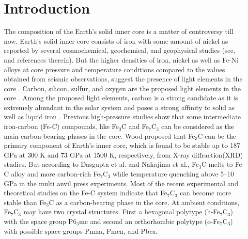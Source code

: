 \documentclass[prb,aps,preprint]{revtex4-2}
\begin{document}
\section{Introduction}
The composition of the Earth's solid inner core is a matter of controversy till now. Earth's solid inner core consists of  iron with some amount of nickel as reported by several cosmochemical, geochemical, and geophysical studies (see\cite{dubrovinsky2007body,lin2002iron,birch1952elasticity}, and references therein). But the higher densities of iron, nickel as well as Fe-Ni alloys at core pressure and temperature conditions compared to the values obtained from seismic observations, suggest the presence of light elements in the core \cite{dziewonski1981preliminary, stevenson1981models}. Carbon, silicon, sulfur, and oxygen are the proposed light elements in the  core \cite{cote2008light, allegre2001chemical}. Among the proposed light elements, carbon is a strong candidate as it is extremely abundant in the solar system and poses a strong affinity to solid as well as liquid iron \cite{wood1993carbon}.
Previous high-pressure studies show that some intermediate iron-carbon (Fe-C) compounds, like Fe$_{3}$C and Fe$_{7}$C$_{3}$ can be considered as the main carbon-bearing phases in the core\cite{liu2016phase}. Wood\cite{wood1993carbon} proposed that Fe$_{3}$C can be the primary component of Earth's inner core, which is found to be stable up to 187 GPa at 300 K and 73 GPa at 1500 K, respectively, from X-ray diffraction(XRD) studies\cite{scott2001stability,li2002compression,sata2010compression}. But according to Dasgupta et al.\cite{dasgupta2009high} and Nakajima et al.\cite{nakajima2009carbon}, Fe$_{3}$C melts to Fe-C alloy and more carbon-rich Fe$_{7}$C$_{3}$ while temperature quenching above 5–10 GPa in the multi anvil press experiments. Most of the recent experimental and theoretical studies on the Fe-C system indicate that Fe$_{7}$C$_{3}$ can become more stable than Fe$_{3}$C as a carbon-bearing phase in the core\cite{lord2009melting,mookherjee2011high,nakajima2011thermoelastic}.
At ambient conditions, Fe$_{7}$C$_{3}$ may have two crystal structures. First a hexagonal polytype (h-Fe$_{7}$C$_{3}$) with the space group P6$_{3}$mc\cite{mookherjee2011high}\cite{nakajima2011thermoelastic}\cite{chen2014hidden} and second an orthorhombic polytype (o-Fe$_{7}$C$_{3}$) with possible space groups Pnma, Pmcn, and Pbca\cite{eckstrom1950new,herbstein1964identification,fruchart1969twin,tsuzuki1984high,litasov2015thermal,prescher2015high,lai2018high}.
\end{document}
